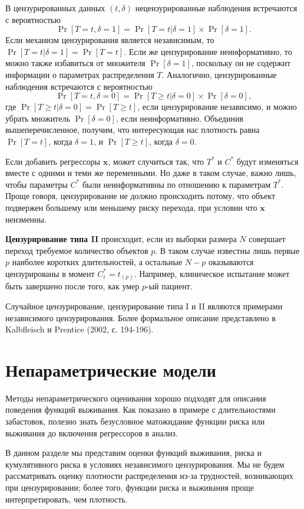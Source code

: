 В цензурированных данных $(t,\delta)$ нецензурированные наблюдения встречаются с вероятностью
    $$\Pr{[T=t,\delta=1]}=\Pr{[T=t|\delta=1]}\times\Pr{[\delta=1]}.$$
Если механизм цензурирования является независимым, то $\Pr{[T=t|\delta=1]}=\Pr{[T=t]}$. Если же цензурирование неинформативно, то можно также избавиться от множителя $\Pr{[\delta=1]}$, поскольку он не содержит информации о параметрах распределения $T$. Аналогично, цензурированные наблюдения встречаются с вероятностью
    $$\Pr{[T=t,\delta=0]}=\Pr{[T\ge t|\delta=0]}\times\Pr{[\delta=0]},$$
где $\Pr{[T\ge t|\delta=0]}=\Pr{[T\ge t]}$, если цензурирование независимо, и можно убрать множитель $\Pr{[\delta=0]}$, если неинформативно. Объединив вышеперечисленное, получим, что интересующая нас плотность равна $\Pr{[T=t]}$, когда $\delta=1$, и $\Pr{[T\ge t]}$, когда $\delta=0$.

Если добавить регрессоры $\mathbf{x}$, может случиться так, что $T^*$ и $C^*$ будут изменяться вместе с одними и теми же переменными. Но даже в таком случае, важно лишь, чтобы параметры $C^*$ были неинформативны по отношению к параметрам $T^*$. Проще говоря, цензурирование не должно происходить потому, что объект подвержен большему или меньшему риску перехода, при условии что $\mathbf{x}$ неизменны.

\textbf{Цензурирование типа II} происходит, если из выборки размера $N$ совершает переход требуемое количество объектов $p$. В таком случае известны лишь первые $p$ наиболее коротких длительностей, а остальные $N-p$ оказываются цензурированы в момент $C^*_i=t_{(p)}$. Например, клиническое испытание может быть завершено после того, как умер $p$-ый пациент.

Случайное цензурирование, цензурирование типа I и II являются примерами независимого цензурирования. Более формальное описание представлено в Kalbfleisch и Prentice (2002, с. 194-196).


\section{Непараметрические модели}\label{sec:17.5}

\noindent
Методы непараметрического оценивания хорошо подходят для описания поведения функций выживания. Как показано в примере с длительностями забастовок, полезно знать безусловное матожидание функции риска или выживания до включения регрессоров в анализ.

В данном разделе мы представим оценки функций выживания, риска и кумулятивного риска в условиях независимого цензурирования. Мы не будем рассматривать оценку плотности распределения из-за трудностей, возникающих при цензурировании; более того, функции риска и выживания проще интерпретировать, чем плотность.

